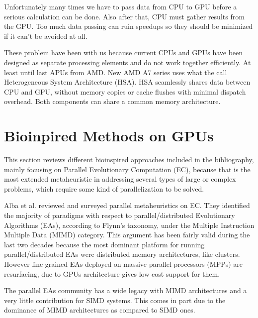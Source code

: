 \documentclass{comjnl}
\begin{document}
Unfortunately many times we have to pass data from CPU to GPU before a serious calculation can be done. Also after that, CPU must gather results from the GPU. Too much data passing can ruin speedups so they should be minimized if it can't be avoided at all.

These problem have been with us because current CPUs and GPUs have been designed as separate processing elements and do not work together efficiently. At least until last APUs from AMD. New AMD A7 series uses what the call Heterogeneous System Architecture (HSA). HSA seamlessly shares data between CPU and GPU, without memory copies or cache flushes with minimal dispatch overhead. Both components can share a common memory architecture.

\section{Bioinpired Methods on GPUs}
\label{sec:bioinfor_apps}

This section reviews different bioinspired approaches included in the bibliography, mainly focusing on Parallel Evolutionary Computation (EC), because that is the most extended metaheuristic in addressing several types of large or complex problems, which require some kind of parallelization to be solved.

Alba et al. \cite{Alba2005book} reviewed and surveyed parallel metaheuristics on EC. They identified the majority of paradigms with respect to parallel/distributed Evolutionary Algorithms (EAs), according to Flynn's taxonomy, under the Multiple Instruction Multiple Data (MIMD) category. This argument has been fairly valid during the last two decades because the most dominant platform for running parallel/distributed EAs were distributed memory architectures, like clusters. However fine-grained EAs deployed on massive parallel processors (MPPs) are resurfacing, due to GPUs architecture gives low cost support for them.

The parallel EAs community has a wide legacy with MIMD architectures and a very little contribution for SIMD systems. This comes in part due to the dominance of MIMD architectures as compared to SIMD ones.
\end{document}
